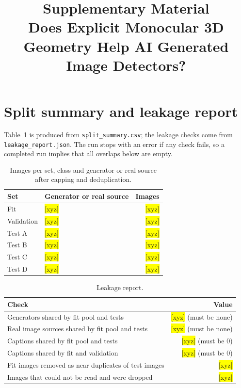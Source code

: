 \documentclass[11pt,a4paper]{article}
\title{Supplementary Material\\ Does Explicit Monocular 3D Geometry Help AI Generated Image Detectors?}
\author{}
\date{}
\newcommand{\xyz}[1][]{\colorbox{yellow}{[xyz]}}
\begin{document}
\maketitle

\section{Split summary and leakage report}

Table~\ref{tab:s_split} is produced from \texttt{split\_summary.csv}; the leakage checks come from \texttt{leakage\_report.json}. The run stops with an error if any check fails, so a completed run implies that all overlaps below are empty.

\begin{table}[h]
\centering
\caption{Images per set, class and generator or real source after capping and deduplication.}
\label{tab:s_split}
\small
\begin{tabular}{@{}llr@{}}
\toprule
Set & Generator or real source & Images \\
\midrule
Fit & \xyz[split.fit.sources] & \xyz[split.fit.n] \\
Validation & \xyz[split.val.sources] & \xyz[split.val.n] \\
Test A & \xyz[split.A.sources] & \xyz[split.A.n] \\
Test B & \xyz[split.B.sources] & \xyz[split.B.n] \\
Test C & \xyz[split.C.sources] & \xyz[split.C.n] \\
Test D & \xyz[split.D.sources] & \xyz[split.D.n] \\
\bottomrule
\end{tabular}
\end{table}

\begin{table}[h]
\centering
\caption{Leakage report.}
\small
\begin{tabular}{@{}lr@{}}
\toprule
Check & Value \\
\midrule
Generators shared by fit pool and tests & \xyz[leak.generator_overlap]{} (must be none) \\
Real image sources shared by fit pool and tests & \xyz[leak.real_source_overlap]{} (must be none) \\
Captions shared by fit pool and tests & \xyz[leak.prompt_overlap]{} (must be 0) \\
Captions shared by fit and validation & \xyz[leak.fitval_prompt_overlap]{} (must be 0) \\
Fit images removed as near duplicates of test images & \xyz[leak.dedup_removed] \\
Images that could not be read and were dropped & \xyz[leak.unreadable] \\
\bottomrule
\end{tabular}
\end{table}
\end{document}
